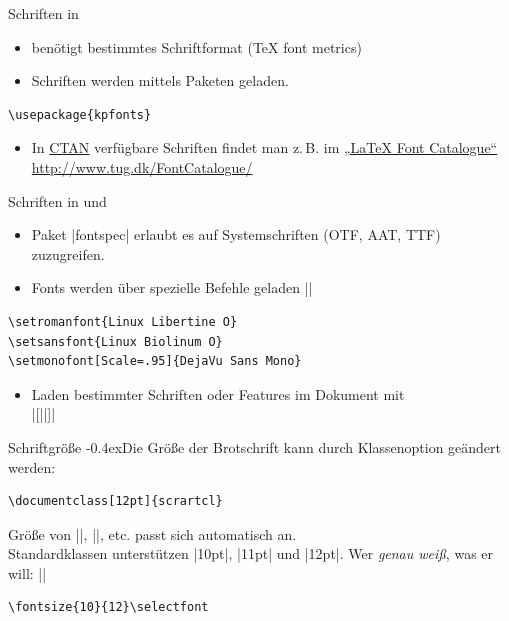 \documentclass[
	vorläufig=true,
	datum=2016-10-28,
	titel={Allgemeine Formatierung und Pakete},
	web=true,
]{../tex/latexkurs-slides}
\begin{document}
\begin{frame}[fragile,t]{Schriften in }
\begin{itemize}
\item {} benötigt bestimmtes Schriftformat (\TeX{} font metrics)
\item Schriften werden mittels Paketen geladen.
\end{itemize}
\begin{lstlisting}
\usepackage{kpfonts}
\end{lstlisting}
\begin{itemize}
\item In \href{http://www.ctan.org}{CTAN} verfügbare Schriften findet man z.\,B. im \href{http://www.tug.dk/FontCatalogue/}{„LaTeX Font Catalogue“}\\\url{http://www.tug.dk/FontCatalogue/}
\end{itemize}
\end{frame}

\begin{frame}[fragile,t]{Schriften in \XeLaTeX und }
\begin{itemize}
\item Paket |fontspec| erlaubt es auf Systemschriften (OTF, AAT, TTF) zuzugreifen.
\item Fonts werden über spezielle Befehle geladen ||
\end{itemize}
\begin{lstlisting}
\setromanfont{Linux Libertine O}
\setsansfont{Linux Biolinum O}
\setmonofont[Scale=.95]{DejaVu Sans Mono}
\end{lstlisting}
\begin{olcol}
\begin{itemize}
\item Laden bestimmter Schriften oder Features im Dokument mit\\|[||]|
\end{itemize}
\end{olcol}
\end{frame}

\begin{frame}[fragile]{Schriftgröße}%
\kern-0.4exDie Größe der Brotschrift kann durch Klassenoption geändert werden:
\begin{lstlisting}
\documentclass[12pt]{scrartcl}
\end{lstlisting}
Größe von |\large|, |\small|, etc. passt sich automatisch an.\\
Standardklassen unterstützen |10pt|, |11pt| und |12pt|.
\vfill
\pause
Wer \emph{genau weiß}, was er will: |\selectfont|
\begin{lstlisting}
\fontsize{10}{12}\selectfont
\end{lstlisting}
\end{frame}
\end{document}
